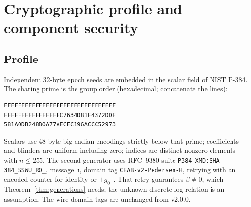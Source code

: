 \documentclass[pdflatex,sn-mathphys-num,twocolumn]{sn-jnl}
\theoremstyle{plain}
\theoremstyle{definition}
\newcommand{\code}[1]{\texttt{#1}}
\begin{document}
\section{Cryptographic profile and component security}\label{sec:crypto}

\subsection{Profile}\label{sec:profile}
Independent 32-byte epoch seeds are embedded in the scalar field of NIST P-384. The sharing prime is the group order (hexadecimal; concatenate the lines):
\begin{Verbatim}[fontsize=\small]
FFFFFFFFFFFFFFFFFFFFFFFFFFFFFFFF
FFFFFFFFFFFFFFFFC7634D81F4372DDF
581A0DB248B0A77AECEC196ACCC52973
\end{Verbatim}
Scalars use 48-byte big-endian encodings strictly below that prime; coefficients and blinders are uniform including zero; indices are distinct nonzero elements with $n\le255$. The second generator uses RFC~9380 suite \code{P384\_XMD:SHA-384\_SSWU\_RO\_}, message \code{h}, domain tag \code{CEAB-v2-Pedersen-H}, retrying with an encoded counter for identity or $\pm g_0$~\cite{rfc9380,sec2}. That retry guarantees $\beta\ne0$, which Theorem~\ref{thm:generations} needs; the unknown discrete-log relation is an assumption. The wire domain tags are unchanged from v2.0.0.
\end{document}
